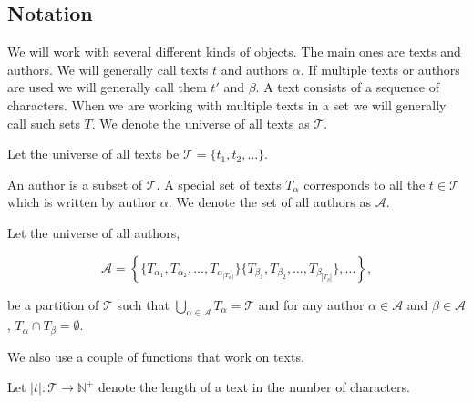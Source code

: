 \subsection{Notation}

We will work with several different kinds of objects. The main ones are texts
and authors. We will generally call texts $t$ and authors $\alpha$. If multiple
texts or authors are used we will generally call them $t'$ and $\beta$. A text
consists of a sequence of characters. When we are working with multiple texts in
a set we will generally call such sets $T$. We denote the universe of all texts
as $\mathcal{T}$.

\begin{definition}
    \label{def:text_universe}

    Let the universe of all texts be $\mathcal{T} = \{t_1, t_2, \dots\}$.

\end{definition}

An author is a subset of $\mathcal{T}$. A special set of texts $T_\alpha$
corresponds to all the $t \in \mathcal{T}$ which is written by author $\alpha$.
We denote the set of all authors as $\mathcal{A}$.

\begin{definition}
    \label{def:author_universe}

    Let the universe of all authors,

    \begin{equation}
        \mathcal{A} = \left\{\{T_{\alpha_1}, T_{\alpha_2}, \dots,
            T_{\alpha_{|T_\alpha|}}\} \{T_{\beta_1}, T_{\beta_2},
            \dots, T_{\beta_{|T_\beta|}}\}, \dots\right\},
    \end{equation}

    be a partition of $\mathcal{T}$ such that $\bigcup_{\alpha \in \mathcal{A}}
    T_\alpha = \mathcal{T}$ and for any author $\alpha \in \mathcal{A}$ and
    $\beta \in \mathcal{A}$, $T_\alpha \cap T_\beta = \emptyset$.

\end{definition}

We also use a couple of functions that work on texts.

\begin{definition}
    \label{def:text_length}

    Let $|t| \colon \mathcal{T} \rightarrow \mathbb{N}^+$ denote the length of a
    text in the number of characters.

\end{definition}

